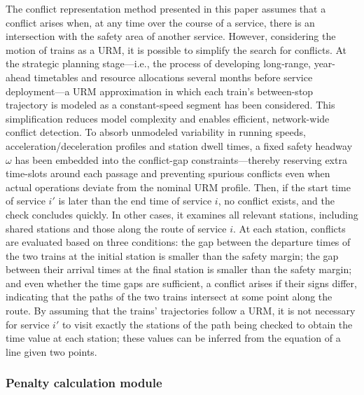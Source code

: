 \documentclass[Afour,sagev,times]{sagej}
\begin{document}
The conflict representation method presented in this paper assumes that a conflict arises when, at any time over the course of a service, there is an intersection with the safety area of another service. However, considering the motion of trains as a \gls{URM}, it is possible to simplify the search for conflicts. At the strategic planning stage—i.e., the process of developing long‐range, year-ahead timetables and resource allocations several months before service deployment—a \gls{URM} approximation in which each train’s between-stop trajectory is modeled as a constant-speed segment has been considered. This simplification reduces model complexity and enables efficient, network-wide conflict detection. To absorb unmodeled variability in running speeds, acceleration/deceleration profiles and station dwell times, a fixed safety headway $\omega$ has been embedded into the conflict-gap constraints—thereby reserving extra time-slots around each passage and preventing spurious conflicts even when actual operations deviate from the nominal \gls{URM} profile. Then, if the start time of service \(i'\) is later than the end time of service \(i\), no conflict exists, and the check concludes quickly. In other cases, it examines all relevant stations, including shared stations and those along the route of service \(i\). At each station, conflicts are evaluated based on three conditions: the gap between the departure times of the two trains at the initial station is smaller than the safety margin; the gap between their arrival times at the final station is smaller than the safety margin; and even whether the time gaps are sufficient, a conflict arises if their signs differ, indicating that the paths of the two trains intersect at some point along the route. By assuming that the trains' trajectories follow a \gls{URM},  it is not necessary for service $i'$ to visit exactly the stations of the path being checked to obtain the time value at each station; these values can be inferred from the equation of a line given two points.

\subsubsection{Penalty calculation module}
\label{sec:penalty_calculation_module}
\end{document}
